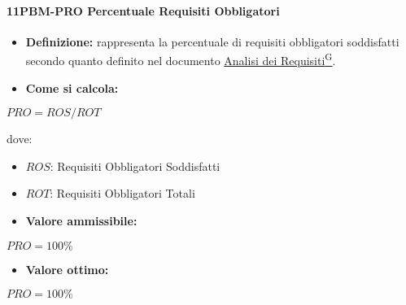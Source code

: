 \paragraph*{11PBM-PRO Percentuale Requisiti Obbligatori}
\begin{itemize}
    \item \textbf{Definizione:} rappresenta la percentuale di requisiti obbligatori soddisfatti secondo quanto definito nel documento \href{https://code7crusaders.github.io/docs/PB/documentazione_interna/glossario.html#analisi-dei-requisiti}{Analisi dei Requisiti\textsuperscript{G}}.
    \item \textbf{Come si calcola:}
\end{itemize}
\begin{center}
   $PRO = ROS/ROT$ 
\end{center}
dove:
\begin{itemize}[label=$\rightarrow$]
    \item $ROS$: Requisiti Obbligatori Soddisfatti
    \item $ROT$: Requisiti Obbligatori Totali
\end{itemize}
\begin{itemize}
    \item \textbf{Valore ammissibile:}
\end{itemize}
\begin{center}
    $PRO = 100\%$
\end{center}
\begin{itemize}
    \item \textbf{Valore ottimo:}
\end{itemize}
\begin{center}
    $PRO = 100\%$
\end{center}

